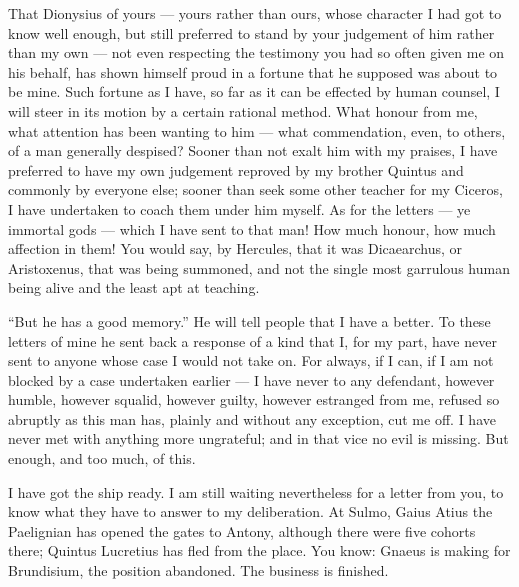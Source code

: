 

 That Dionysius of yours --- yours rather than ours, whose character I had got to know well enough, but still preferred to stand by your judgement of him rather than my own --- not even respecting the testimony you had so often given me on his behalf, has shown himself proud in a fortune that he supposed was about to be mine. Such fortune as I have, so far as it can be effected by human counsel, I will steer in its motion by a certain rational method. What honour from me, what attention has been wanting to him --- what commendation, even, to others, of a man generally despised? Sooner than not exalt him with my praises, I have preferred to have my own judgement reproved by my brother Quintus and commonly by everyone else; sooner than seek some other teacher for my Ciceros, I have undertaken to coach them under him myself. As for the letters --- ye immortal gods --- which I have sent to that man! How much honour, how much affection in them! You would say, by Hercules, that it was Dicaearchus, or Aristoxenus, that was being summoned, and not the single most garrulous human being alive and the least apt at teaching.

 ``But he has a good memory.'' He will tell people that I have a better. To these letters of mine he sent back a response of a kind that I, for my part, have never sent to anyone whose case I would not take on. For always, if I can, if I am not blocked by a case undertaken earlier --- I have never to any defendant, however humble, however squalid, however guilty, however estranged from me, refused so abruptly as this man has, plainly and without any exception, cut me off. I have never met with anything more ungrateful; and in that vice no evil is missing. But enough, and too much, of this.

 I have got the ship ready. I am still waiting nevertheless for a letter from you, to know what they have to answer to my deliberation. At Sulmo, Gaius Atius the Paelignian has opened the gates to Antony, although there were five cohorts there; Quintus Lucretius has fled from the place. You know: Gnaeus is making for Brundisium, the position abandoned. The business is finished.

